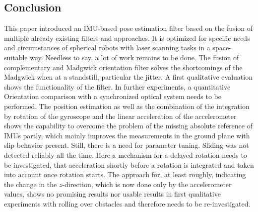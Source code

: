 \documentclass[letterpaper, 10 pt, conference]{ieeeconf}  %
\begin{document}
\subsection{Conclusion}
This paper introduced an IMU-based pose estimation filter based on the fusion of multiple already existing filters and approaches.
It is optimized for specific needs and circumstances of spherical robots with laser scanning tasks in a space-suitable way.
Needless to say, a lot of work remains to be done.
The fusion of complementary and Madgwick orientation filter solves the shortcomings of the Madgwick when at a standstill, particular the jitter.
A first qualitative evaluation shows the functionality of the filter.
In further experiments, a quantitative Orientation comparison with a synchronized optical system needs to be performed.
The position estimation as well as the combination of the integration by rotation of the gyroscope and the linear acceleration of the accelerometer  shows the capability to overcome the problem of the missing absolute reference of IMUs partly, which mainly  improves the measurements in the ground plane with slip behavior present.
Still, there is a need for parameter tuning. 
Sliding was not detected reliably all the time.
Here a mechanism for a delayed rotation needs to be investigated, that acceleration shortly before a rotation is integrated and taken into account once rotation starts.
The approach for, at least roughly, indicating the change in the $z$-direction, which is now done only by the accelerometer values, shows no promising results nor usable results in first qualitative experiments with rolling over obstacles and therefore needs to be re-investigated.




\addtolength{\textheight}{-12cm}   %




\end{document}
